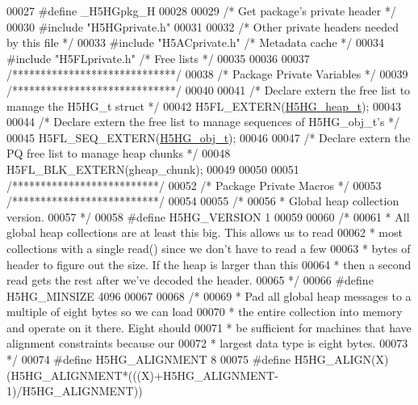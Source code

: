 \begin{DoxyCode}
00027 \textcolor{preprocessor}{#define \_H5HGpkg\_H}
00028 
00029 \textcolor{comment}{/* Get package's private header */}
00030 \textcolor{preprocessor}{#include "H5HGprivate.h"}
00031 
00032 \textcolor{comment}{/* Other private headers needed by this file */}
00033 \textcolor{preprocessor}{#include "H5ACprivate.h"}    \textcolor{comment}{/* Metadata cache           */}
00034 \textcolor{preprocessor}{#include "H5FLprivate.h"}    \textcolor{comment}{/* Free lists                           */}
00035 
00036 
00037 \textcolor{comment}{/*****************************/}
00038 \textcolor{comment}{/* Package Private Variables */}
00039 \textcolor{comment}{/*****************************/}
00040 
00041 \textcolor{comment}{/* Declare extern the free list to manage the H5HG\_t struct */}
00042 H5FL\_EXTERN(\hyperlink{struct_h5_h_g__heap__t}{H5HG\_heap\_t});
00043 
00044 \textcolor{comment}{/* Declare extern the free list to manage sequences of H5HG\_obj\_t's */}
00045 H5FL\_SEQ\_EXTERN(\hyperlink{struct_h5_h_g__obj__t}{H5HG\_obj\_t});
00046 
00047 \textcolor{comment}{/* Declare extern the PQ free list to manage heap chunks */}
00048 H5FL\_BLK\_EXTERN(gheap\_chunk);
00049 
00050 
00051 \textcolor{comment}{/**************************/}
00052 \textcolor{comment}{/* Package Private Macros */}
00053 \textcolor{comment}{/**************************/}
00054 
00055 \textcolor{comment}{/*}
00056 \textcolor{comment}{ * Global heap collection version.}
00057 \textcolor{comment}{ */}
00058 \textcolor{preprocessor}{#define H5HG\_VERSION    1}
00059 
00060 \textcolor{comment}{/*}
00061 \textcolor{comment}{ * All global heap collections are at least this big.  This allows us to read}
00062 \textcolor{comment}{ * most collections with a single read() since we don't have to read a few}
00063 \textcolor{comment}{ * bytes of header to figure out the size.  If the heap is larger than this}
00064 \textcolor{comment}{ * then a second read gets the rest after we've decoded the header.}
00065 \textcolor{comment}{ */}
00066 \textcolor{preprocessor}{#define H5HG\_MINSIZE    4096}
00067 
00068 \textcolor{comment}{/*}
00069 \textcolor{comment}{ * Pad all global heap messages to a multiple of eight bytes so we can load}
00070 \textcolor{comment}{ * the entire collection into memory and operate on it there.  Eight should}
00071 \textcolor{comment}{ * be sufficient for machines that have alignment constraints because our}
00072 \textcolor{comment}{ * largest data type is eight bytes.}
00073 \textcolor{comment}{ */}
00074 \textcolor{preprocessor}{#define H5HG\_ALIGNMENT  8}
00075 \textcolor{preprocessor}{#define H5HG\_ALIGN(X)   (H5HG\_ALIGNMENT*(((X)+H5HG\_ALIGNMENT-1)/H5HG\_ALIGNMENT))}

\end{DoxyCode}

